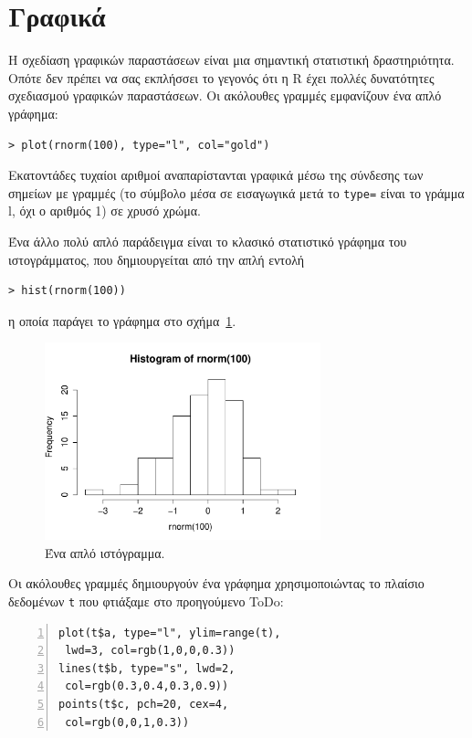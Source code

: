 \documentclass[a4paper,10pt,twocolumn]{article}
\begin{document}
\section{Γραφικά}
\label{sec:some-plotting}

Η σχεδίαση γραφικών παραστάσεων είναι μια σημαντική στατιστική δραστηριότητα. Οπότε δεν πρέπει να σας εκπλήσσει
το γεγονός ότι η R έχει πολλές δυνατότητες σχεδιασμού γραφικών παραστάσεων. Οι ακόλουθες γραμμές εμφανίζουν ένα
απλό γράφημα:
\begin{Verbatim}[frame=single,gobble=0]
> plot(rnorm(100), type="l", col="gold")
\end{Verbatim}

\noindent Εκατοντάδες τυχαίοι αριθμοί αναπαρίστανται γραφικά μέσω της σύνδεσης των σημείων με γραμμές (το 
σύμβολο μέσα σε εισαγωγικά μετά το \texttt{type=} είναι το γράμμα l, όχι ο αριθμός 1) σε χρυσό χρώμα.

Ένα άλλο πολύ απλό παράδειγμα είναι το κλασικό στατιστικό γράφημα του ιστογράμματος, που δημιουργείται από
την απλή εντολή
\begin{Verbatim}[frame=single,gobble=0]
  > hist(rnorm(100))
\end{Verbatim}
η οποία παράγει το γράφημα στο σχήμα~\ref{fig:hist}.
\begin{figure}[h]
  \centering
  \includegraphics[width=8cm]{img/hist.pdf}
  \caption{Ένα απλό ιστόγραμμα.}
  \label{fig:hist}
\end{figure}

\noindent Οι ακόλουθες γραμμές δημιουργούν ένα γράφημα χρησιμοποιώντας το πλαίσιο δεδομένων \texttt{t} που 
φτιάξαμε στο προηγούμενο ToDo:
\begin{Verbatim}[frame=single,numbers=left,gobble=0, xleftmargin=0.35cm, numbersep=0.1cm]
plot(t$a, type="l", ylim=range(t), 
 lwd=3, col=rgb(1,0,0,0.3))
lines(t$b, type="s", lwd=2, 
 col=rgb(0.3,0.4,0.3,0.9))
points(t$c, pch=20, cex=4, 
 col=rgb(0,0,1,0.3))
\end{Verbatim} 
\end{document}
